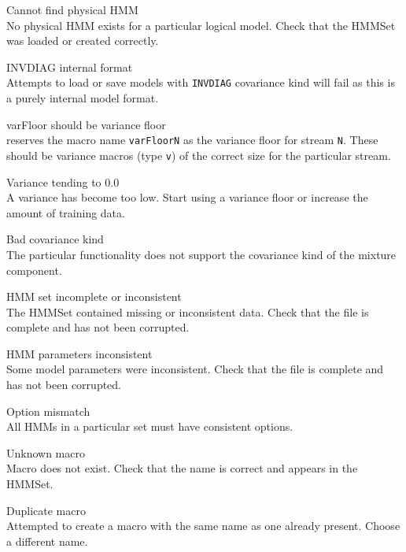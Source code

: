 \begin{itemize}
\begin{itemize}
\end{itemize}


\begin{itemize}
    Cannot find physical HMM\\
        No physical HMM exists for a particular logical model.  Check that the
        HMMSet was loaded or created correctly.

    INVDIAG internal format\\
        Attempts to load or save models with \texttt{INVDIAG} covariance kind
        will fail as this is a purely internal model format.

 varFloor should be variance floor\\
         reserves the macro name \texttt{varFloorN} as the 
        variance floor for stream \texttt{N}.  These should be variance 
        macros (type \texttt{v}) of the correct size for the particular stream.

    Variance tending to 0.0\\
        A variance has become too low.  Start using a variance floor or 
        increase the amount of training data.
        
 Bad covariance kind\\
        The particular functionality does not support the covariance
        kind of the mixture component.

    HMM set incomplete or inconsistent\\
        The HMMSet contained missing or inconsistent data.  Check that the 
        file is complete and has not been corrupted.

    HMM parameters inconsistent\\
        Some model parameters were inconsistent.  Check that the file is 
        complete and has not been corrupted.

 Option mismatch\\
        All HMMs in a particular set must have consistent options.

    Unknown macro\\
        Macro does not exist.  Check that the name is correct and appears 
        in the HMMSet.

    Duplicate macro\\
        Attempted to create a macro with the same name as one already present.
        Choose a different name.


\end{itemize}
\end{itemize}
